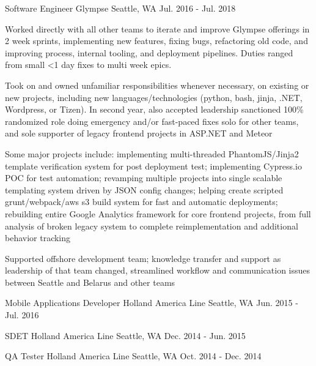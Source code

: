 \begin{cventries}
\cventry
{Software Engineer} %
{Glympse} %
{Seattle, WA} %
{Jul. 2016 - Jul. 2018} %
{
\begin{cvitems}
\item {Worked directly with all other teams to iterate and improve Glympse offerings in 2 week sprints, implementing new features, fixing bugs, refactoring old code, and improving process, internal tooling, and deployment pipelines. Duties ranged from small <1 day fixes to multi week epics. }
\item {Took on and owned unfamiliar responsibilities whenever necessary, on existing or new projects, including new languages/technologies (python, bash, jinja, .NET, Wordpress, or Tizen). In second year, also accepted leadership sanctioned 100\% randomized role doing emergency and/or fast-paced fixes solo for other teams, and sole supporter of legacy frontend projects in ASP.NET and Meteor}
\item {Some major projects include: implementing multi-threaded PhantomJS/Jinja2 template verification system for post deployment test; implementing Cypress.io POC for test automation; revamping multiple projects into single scalable templating system driven by JSON config changes; helping create scripted grunt/webpack/aws s3 build system for fast and automatic deployments; rebuilding entire Google Analytics framework for core frontend projects, from full analysis of broken legacy system to complete reimplementation and additional behavior tracking}
\item {Supported offshore development team; knowledge transfer and support as leadership of that team changed, streamlined workflow and communication issues between Seattle and Belarus and other teams}
\end{cvitems}
}

\cventry
{Mobile Applications Developer} %
{Holland America Line} %
{Seattle, WA} %
{Jun. 2015 - Jul. 2016} %
{}

\cventry
{SDET} %
{Holland America Line} %
{Seattle, WA} %
{Dec. 2014 - Jun. 2015} %
{}

\cventry
{QA Tester} %
{Holland America Line} %
{Seattle, WA} %
{Oct. 2014 - Dec. 2014} %
{}


\end{cventries}
